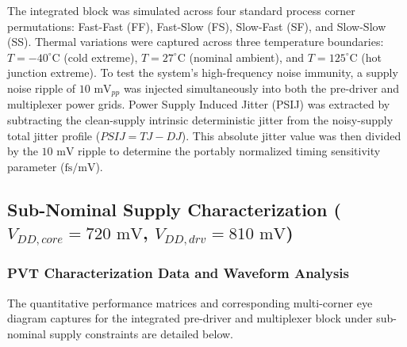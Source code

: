The integrated block was simulated across four standard process corner permutations: Fast-Fast (FF), Fast-Slow (FS), Slow-Fast (SF), and Slow-Slow (SS). Thermal variations were captured across three temperature boundaries: $T = -40^{\circ}\text{C}$ (cold extreme), $T = 27^{\circ}\text{C}$ (nominal ambient), and $T = 125^{\circ}\text{C}$ (hot junction extreme). To test the system's high-frequency noise immunity, a supply noise ripple of $10\text{ mV}_{pp}$ was injected simultaneously into both the pre-driver and multiplexer power grids. Power Supply Induced Jitter (PSIJ) was extracted by subtracting the clean-supply intrinsic deterministic jitter from the noisy-supply total jitter profile ($PSIJ = TJ - DJ$). This absolute jitter value was then divided by the $10\text{ mV}$ ripple to determine the portably normalized timing sensitivity parameter ($\text{fs/mV}$).

\clearpage
\subsection*{Sub-Nominal Supply Characterization ($V_{DD,core} = 720\text{ mV}$, $V_{DD,drv} = 810\text{ mV}$)}
\subsubsection*{PVT Characterization Data and Waveform Analysis}

The quantitative performance matrices and corresponding multi-corner eye diagram captures for the integrated pre-driver and multiplexer block under sub-nominal supply constraints are detailed below.

